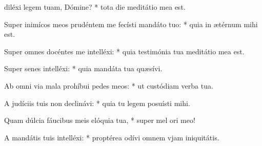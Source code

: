 \begin{psalmus}

 diléxi legem tuam, Dómine? * tota die meditátio mea est.

Super inimícos meos prudéntem me fecísti mandáto tuo: * quia in ætérnum mihi est.

Super omnes docéntes me intelléxi: * quia testimónia tua meditátio mea est.

Super senes intelléxi: * quia mandáta tua quæsívi.

Ab omni via mala prohíbui pedes meos: * ut custódiam verba tua.

A judíciis tuis non declinávi: * quia tu legem posuísti mihi.

Quam dúlcia fáucibus meis elóquia tua, * super mel ori meo!

A mandátis tuis intelléxi: * proptérea odívi omnem vjam iniquitátis.

\end{psalmus}
